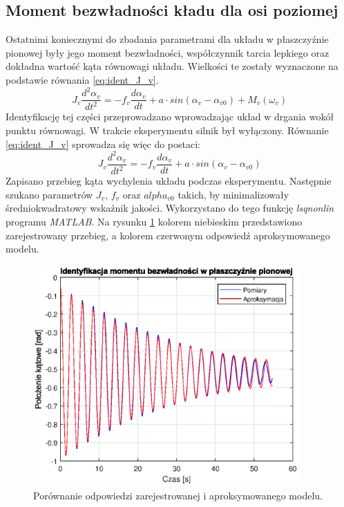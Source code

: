 \documentclass[11pt,a4paper]{article}
\begin{document}
\subsection{Moment bezwładności kładu dla osi poziomej}
Ostatnimi koniecznymi do zbadania parametrami dla układu w płaszczyźnie pionowej były jego moment bezwładności, współczynnik tarcia lepkiego oraz dokładna wartość kąta równowagi układu. Wielkości te zostały wyznaczone na podstawie równania \eqref{eq:ident_J_v}.
\begin{equation}
J_v \frac{d^2\alpha_v}{dt^2} = -f_v\frac{d\alpha_v}{dt}+a\cdot sin(\alpha_v-\alpha_{v0})+M_v(\omega_v)
\label{eq:ident_J_v}
\end{equation}
Identyfikację tej części przeprowadzano wprowadzając układ w drgania wokół punktu równowagi. W trakcie eksperymentu silnik był wyłączony. Równanie \eqref{eq:ident_J_v} sprowadza się więc do postaci:
\begin{equation}
J_v \frac{d^2\alpha_v}{dt^2} = -f_v\frac{d\alpha_v}{dt}+a\cdot sin(\alpha_v-\alpha_{v0})
\end{equation}
Zapisano przebieg kąta wychylenia układu podczas eksperymentu. Następnie szukano parametrów \(J_v\), \(f_v\) oraz \(alpha_{v0}\) takich, by minimalizowały średniokwadratowy wskaźnik jakości. Wykorzystano do tego funkcję \textit{lsqnonlin} programu \textit{MATLAB}. Na rysunku \ref{fig:ident_J_v} kolorem niebieskim przedstawiono zarejestrowany przebieg, a kolorem czerwonym odpowiedź aproksymowanego modelu.

\begin{figure}[H]
	\centering
	\includegraphics[width=4in]{Figures/ident_J_v.eps}
	\caption{Porównanie odpowiedzi zarejestrowanej i aproksymowanego modelu.}
	\label{fig:ident_J_v}
\end{figure}
\end{document}
